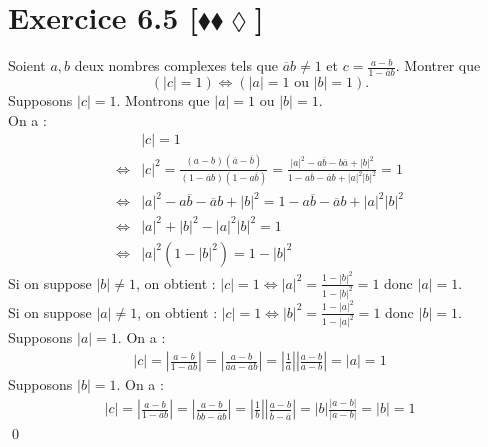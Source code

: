 \documentclass[10pt]{article}
\begin{document}


\section*{Exercice 6.5 [$\blacklozenge\blacklozenge\lozenge$]}
\begin{tcolorbox}[enhanced, width=7in, center, size=fbox, fontupper=\large, drop shadow southwest]
    Soient $a,b$ deux nombres complexes tels que $\overline{a}b\neq1$ et $c=\frac{a-b}{1-\overline{a}b}$. Montrer que
    \begin{equation*}
        (|c|=1) \iff (|a| = 1 \text{ ou } |b| = 1).
    \end{equation*}
    Supposons $|c|=1$. Montrons que $|a|=1$ ou $|b|=1$.\\
    On a :
    \begin{align*}
        &|c|=1\\
        \iff&|c|^2=\frac{(a-b)(\overline{a}-\overline{b})}{(1-\overline{a}b)(1-a\overline{b})}=\frac{|a|^2-a\overline{b}-b\overline{a}+|b|^2}{1-a\overline{b}-\overline{a}b+|a|^2|b|^2}=1\\
        \iff&|a|^2-a\overline{b}-\overline{a}b+|b|^2=1-a\overline{b}-\overline{a}b+|a|^2|b|^2\\
        \iff&|a|^2+|b|^2-|a|^2|b|^2=1\\
        \iff&|a|^2(1-|b|^2)=1-|b|^2
    \end{align*}
    Si on suppose $|b|\neq1$, on obtient : $|c|=1\iff|a|^2=\frac{1-|b|^2}{1-|b|^2}=1$ donc $|a|=1$.\\
    Si on suppose $|a|\neq1$, on obtient : $|c|=1\iff|b|^2=\frac{1-|a|^2}{1-|a|^2}=1$ donc $|b|=1$.\\
    Supposons $|a|=1$. 
    On a :
    \begin{align*}
        |c|=\left|\frac{a-b}{1-\overline{a}b}\right|=\left|\frac{a-b}{\overline{a}a-\overline{a}b}\right|=\left|\frac{1}{\overline{a}}\right|\left|\frac{a-b}{a-b}\right|=|a|=1
    \end{align*}
    Supposons $|b|=1$. 
    On a :
    \begin{align*}
        |c|=\left|\frac{a-b}{1-\overline{a}b}\right|=\left|\frac{a-b}{\overline{b}b-\overline{a}b}\right|=\left|\frac{1}{b}\right|\left|\frac{a-b}{\overline{b}-\overline{a}}\right|=|b|\frac{|a-b|}{|a-b|}=|b|=1
    \end{align*}
    \qed
\end{tcolorbox}
\end{document}
